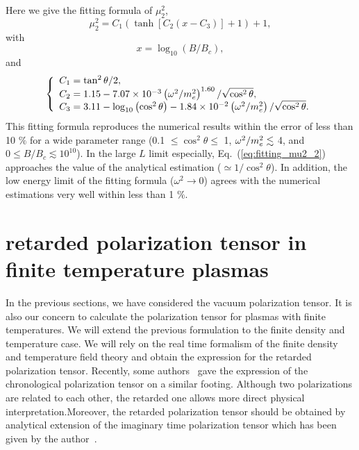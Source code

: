Here we give the fitting formula of $\mu_2^2$,
\begin{equation}
    \label{eq:fitting_mu2_2}
    \mu_2^2 = C_1\left(\tanh\left[C_2(x - C_3)\right] + 1\right)+ 1,
\end{equation}
with
\begin{equation}
    \label{eq:x_logL}
    x = \log_{10}(B/B_c),
\end{equation}
and
\begin{equation}
    \label{eq:coef}
    \left\{
      \begin{array}{ll}
          C_1 = \tan^2\theta/2, \\
          C_2 = 1.15 -
          7.07\times10^{-3}\left(\omega^2/m_e^2\right)^{1.60}
          /\sqrt{\cos^2\theta}, \\
          C_3 = 3.11 -\log_{10}\left(\cos^2\theta \right) -
          1.84\times10^{-2}\left(\omega^2/m_e^2\right)/
          \sqrt{\cos^2\theta}.
      \end{array}
    \right.
\end{equation}
This fitting formula reproduces the numerical results within the error 
of less than 10 $\%$ for a wide parameter range 
(0.1 $\le \cos^2\theta \le$ 1, $\omega^2/m_e^2
\lesssim$ 4, and $0 \le B/B_c \lesssim 10^{10}$). In the
large $L$ limit especially, Eq.~(\ref{eq:fitting_mu2_2}) approaches 
the value of the analytical estimation ($\simeq 1/\cos^2\theta$). 
In addition, the low energy limit of the fitting formula 
($\omega^2 \to 0$) agrees with the
numerical estimations very well within less than 1 $\%$.

\section{retarded polarization tensor in finite temperature plasmas}
\label{sec:plasm}

In the previous sections, we have considered the vacuum polarization 
tensor. It is also our concern to calculate the polarization tensor 
for plasmas with finite temperatures. We will extend the previous 
formulation to the finite density and temperature case. We will rely 
on the real time formalism of the finite density and temperature 
field theory and obtain the expression for the retarded polarization
tensor. Recently, some authors~\cite{gk} gave the expression of the
chronological polarization tensor on a similar footing. Although two 
polarizations are related to each other, the retarded one allows more 
direct physical interpretation.Moreover, the retarded polarization 
tensor should be obtained by analytical extension of the
imaginary time polarization tensor which has been given by the
author~\cite{al}.

